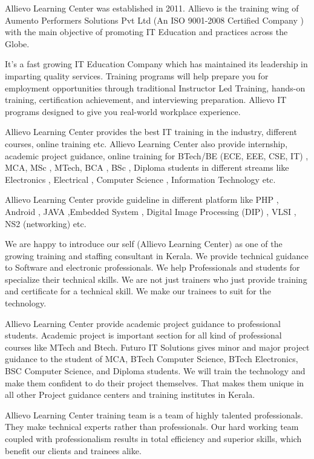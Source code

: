 Allievo Learning Center was established in 2011. Allievo is the training wing of Aumento Performers Solutions Pvt Ltd (An ISO 9001-2008 Certified Company ) with the main objective of promoting IT Education and practices across the Globe.


	It’s a fast growing IT Education Company which has maintained its leadership in imparting quality services. Training programs will help prepare you for employment opportunities through traditional Instructor Led Training, hands-on training, certification achievement, and interviewing preparation. Allievo IT programs designed to give you real-world workplace experience.


	Allievo Learning Center provides the best IT training in the industry, different courses, online training etc. Allievo Learning Center also provide internship, academic project guidance, online training for BTech/BE (ECE, EEE, CSE, IT) , MCA, MSc , MTech, BCA , BSc , Diploma students in different streams like Electronics , Electrical , Computer Science , Information Technology etc.


	Allievo Learning Center provide guideline in different platform like PHP , Android , JAVA ,Embedded System , Digital Image Processing (DIP) , VLSI , NS2 (networking) etc.

We are happy to introduce our self (Allievo Learning Center) as one of the growing training and staffing consultant in Kerala. We provide technical guidance to Software and electronic professionals. We help Professionals and students for specialize their technical skills. We are not just trainers who just provide training and certificate for a technical skill. We make our trainees to suit for the technology.


Allievo Learning Center provide academic project guidance to professional students. Academic project is important section for all kind of professional courses like MTech and Btech. Futuro IT Solutions gives minor and major project guidance to the student of MCA, BTech Computer Science, BTech Electronics, BSC Computer Science, and Diploma students. We will train the technology and make them confident to do their project themselves. That makes them unique in all other Project guidance centers and training institutes in Kerala.


Allievo Learning Center training team is a team of highly talented professionals. They make technical experts rather than professionals. Our hard working team coupled with professionalism results in total efficiency and superior skills, which benefit our clients and trainees alike.


